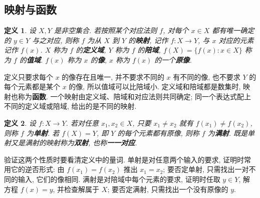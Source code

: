 \documentclass[UTF8,openany]{ctexbook}
\theoremstyle{chinesetextbook}
\newtheorem{definition}{定义}[section]
\begin{document}
\subsection{映射与函数}
\begin{definition}
设 $X,Y$ 是非空集合. 若按照某个对应法则 $f$, 对每个 $x\in X$ 都有唯一确定的 $y\in Y$ 与之对应, 则称 $f$ 为从 $X$ 到 $Y$ 的\textbf{映射}, 记作 $f:X\to Y$, 与 $x$ 对应的元素记作 $f(x)$. $X$ 称为 $f$ 的\textbf{定义域}, $Y$ 称为 $f$ 的\textbf{陪域}, $f(X)=\{f(x):x\in X\}$ 称为 $f$ 的\textbf{值域}. $f(x)$ 称为 $x$ 的\textbf{像}, $x$ 称为 $f(x)$ 的一个\textbf{原像}.
\end{definition}
定义只要求每个 $x$ 的像存在且唯一, 并不要求不同的 $x$ 有不同的像, 也不要求 $Y$ 的每个元素都是某个 $x$ 的像, 所以值域可以比陪域小. 定义域和陪域都是数集时, 映射也称为\textbf{函数}. 一个映射由定义域、陪域和对应法则共同确定; 同一个表达式配上不同的定义域或陪域, 给出的是不同的映射.
\begin{definition}
设 $f:X\to Y$. 若对任意 $x_1,x_2\in X$, 只要 $x_1\ne x_2$ 就有 $f(x_1)\ne f(x_2)$, 则称 $f$ 为\textbf{单射}. 若 $f(X)=Y$, 即 $Y$ 的每个元素都有原像, 则称 $f$ 为\textbf{满射}. 既是单射又是满射的映射称为\textbf{双射}, 也称\textbf{一一对应}.
\end{definition}
验证这两个性质时要看清定义中的量词. 单射是对任意两个输入的要求, 证明时常用它的逆否形式: 由 $f(x_1)=f(x_2)$ 推出 $x_1=x_2$; 要否定单射, 只需找出一对不同的输入, 它们的像相同. 满射是对陪域中每个元素的要求, 证明时任取 $y\in Y$, 解方程 $f(x)=y$, 并检查解属于 $X$; 要否定满射, 只需找出一个没有原像的 $y$.
\end{document}
